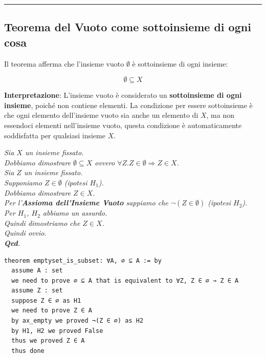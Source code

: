 \documentclass[
  a4paper,
]{article}
\begin{document}
\par\noindent\rule{\linewidth}{0.4pt}\par\vspace{6pt}

\hypertarget{teorema-del-vuoto-come-sottoinsieme-di-ogni-cosa}{%
\subsection{Teorema del Vuoto come sottoinsieme di ogni
cosa}\label{teorema-del-vuoto-come-sottoinsieme-di-ogni-cosa}}

Il teorema afferma che l'insieme vuoto \(\emptyset\) è sottoinsieme di
ogni insieme:

\[
\emptyset \subseteq X
\]

\textbf{Interpretazione}: L'insieme vuoto è considerato un
\textbf{sottoinsieme di ogni insieme}, poiché non contiene elementi. La
condizione per essere sottoinsieme è che ogni elemento dell'insieme
vuoto sia anche un elemento di \(X\), ma non essendoci elementi
nell'insieme vuoto, questa condizione è automaticamente soddisfatta per
qualsiasi insieme \(X\).

\begin{examplebox}[Dimostrazione]

\emph{Sia \(X\) un insieme fissato.}\\
\emph{Dobbiamo dimostrare \(\emptyset \subseteq X\) ovvero
\(\forall Z.Z \in \emptyset \Rightarrow Z \in X\).}\\
\emph{Sia \(Z\) un insieme fissato.}\\
\emph{Supponiamo \(Z \in \emptyset\) (ipotesi \(H_1\)).}\\
\emph{Dobbiamo dimostrare \(Z \in X\).}\\
\emph{Per l'\textbf{Assioma dell'Insieme Vuoto} sappiamo che
\(\neg (Z \in \emptyset )\) (ipotesi \(H_2\)).}\\
\emph{Per \(H_1\), \(H_2\) abbiamo un assurdo.}\\
\emph{Quindi dimostriamo che \(Z \in X\).}\\
\emph{Quindi ovvio.}\\
\emph{\textbf{Qed}.}

\end{examplebox}

\begin{examplebox}

\begin{lstlisting}
theorem emptyset_is_subset: ∀A, ∅ ⊆ A := by
  assume A : set
  we need to prove ∅ ⊆ A that is equivalent to ∀Z, Z ∈ ∅ → Z ∈ A
  assume Z : set
  suppose Z ∈ ∅ as H1
  we need to prove Z ∈ A
  by ax_empty we proved ¬(Z ∈ ∅) as H2
  by H1, H2 we proved False
  thus we proved Z ∈ A
  thus done
\end{lstlisting}

\end{examplebox}
\end{document}
